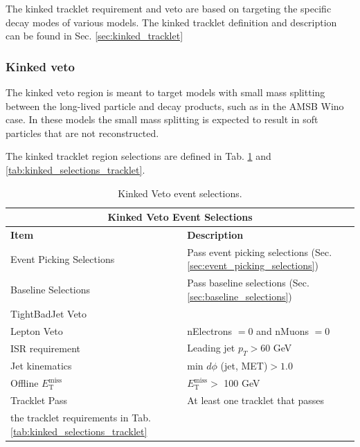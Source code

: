 The kinked tracklet requirement and veto are based on targeting the specific decay modes of various models. The kinked tracklet definition and description can be found in Sec. \ref{sec:kinked_tracklet}

\subsubsection{Kinked veto}
The kinked veto region is meant to target models with small mass splitting between the long-lived particle and decay products, such as in the AMSB Wino case. In these models the small mass splitting is expected to result in soft particles that are not reconstructed. 

The kinked tracklet region selections are defined in Tab. \ref{tab:kinked_selections_event} and \ref{tab:kinked_selections_tracklet}.


\begin{table}
    
        \centering
    \begin{tabular}{ l | l}
        \multicolumn{2}{c}{\textbf{Kinked Veto Event Selections}}\\
		\hline\hline
		 \textbf{Item}              & \textbf{Description}                                            \\ \hline\hline

                        \hline\hline
                        Event Picking Selections & Pass event picking selections (Sec. \ref{sec:event_picking_selections}) \\
                        Baseline Selections & Pass baseline selections (Sec. \ref{sec:baseline_selections})\\
                        TightBadJet Veto & \\
                        Lepton Veto & nElectrons $= 0$ and nMuons $= 0$\\
                        ISR requirement & Leading jet $p_T > 60$ GeV \\
                        Jet kinematics& min $d\phi$ (jet, MET)$ > 1.0$ \\
                        Offline $E_{\mathrm{T}}^{\mathrm{miss}}$               &  $E_{\mathrm{T}}^{\mathrm{miss}} > $ 100 GeV  \\
                        Tracklet Pass & At least one tracklet that passes \\ the tracklet requirements in Tab. \ref{tab:kinked_selections_tracklet} \\
                        \hline
	\end{tabular}
    \caption{Kinked Veto event selections. }
    \label{tab:kinked_selections_event}
\end{table}

